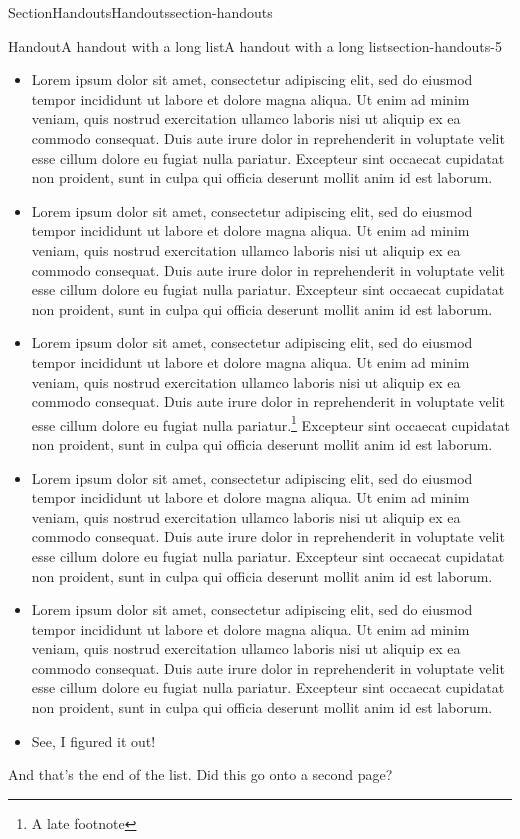 \documentclass[oneside,10pt,]{article}
\newcommand{\ptxlistdisc}{\raisebox{0.3ex}{\textbullet}}
\numberwithin{equation}{section}
\begin{document}
\begin{sectionptx}{Section}{Handouts}{}{Handouts}{}{}{section-handouts}
\begin{handout-subsection}{Handout}{A handout with a long list}{}{A handout with a long list}{}{}{section-handouts-5}
\begin{itemize}[label=\ptxlistdisc]
\item{}Lorem ipsum dolor sit amet, consectetur adipiscing elit, sed do eiusmod tempor incididunt ut labore et dolore magna aliqua. Ut enim ad minim veniam, quis nostrud exercitation ullamco laboris nisi ut aliquip ex ea commodo consequat. Duis aute irure dolor in reprehenderit in voluptate velit esse cillum dolore eu fugiat nulla pariatur. Excepteur sint occaecat cupidatat non proident, sunt in culpa qui officia deserunt mollit anim id est laborum.%
\item{}Lorem ipsum dolor sit amet, consectetur adipiscing elit, sed do eiusmod tempor incididunt ut labore et dolore magna aliqua. Ut enim ad minim veniam, quis nostrud exercitation ullamco laboris nisi ut aliquip ex ea commodo consequat. Duis aute irure dolor in reprehenderit in voluptate velit esse cillum dolore eu fugiat nulla pariatur. Excepteur sint occaecat cupidatat non proident, sunt in culpa qui officia deserunt mollit anim id est laborum.%
\item{}Lorem ipsum dolor sit amet, consectetur adipiscing elit, sed do eiusmod tempor incididunt ut labore et dolore magna aliqua. Ut enim ad minim veniam, quis nostrud exercitation ullamco laboris nisi ut aliquip ex ea commodo consequat. Duis aute irure dolor in reprehenderit in voluptate velit esse cillum dolore eu fugiat nulla pariatur.\footnote{A late footnote\label{section-handouts-5-2-1-9-1-1}} Excepteur sint occaecat cupidatat non proident, sunt in culpa qui officia deserunt mollit anim id est laborum.%
\item{}Lorem ipsum dolor sit amet, consectetur adipiscing elit, sed do eiusmod tempor incididunt ut labore et dolore magna aliqua. Ut enim ad minim veniam, quis nostrud exercitation ullamco laboris nisi ut aliquip ex ea commodo consequat. Duis aute irure dolor in reprehenderit in voluptate velit esse cillum dolore eu fugiat nulla pariatur. Excepteur sint occaecat cupidatat non proident, sunt in culpa qui officia deserunt mollit anim id est laborum.%
\item{}Lorem ipsum dolor sit amet, consectetur adipiscing elit, sed do eiusmod tempor incididunt ut labore et dolore magna aliqua. Ut enim ad minim veniam, quis nostrud exercitation ullamco laboris nisi ut aliquip ex ea commodo consequat. Duis aute irure dolor in reprehenderit in voluptate velit esse cillum dolore eu fugiat nulla pariatur. Excepteur sint occaecat cupidatat non proident, sunt in culpa qui officia deserunt mollit anim id est laborum.%
\item{}See, I figured it out!%
\end{itemize}
And that's the end of the list.  Did this go onto a second page?%
\end{handout-subsection}
\restoregeometry
\end{sectionptx}
\end{document}

